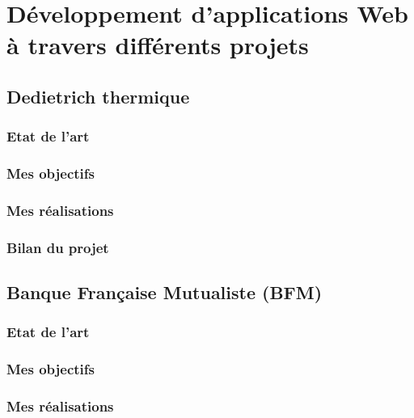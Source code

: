\documentclass[a4paper,11pt,twoside]{report}
\begin{document}
\chapter{Développement d'applications Web à travers différents projets}
  \section{Dedietrich thermique}
    \subsection*{Etat de l'art}
    \subsection*{Mes objectifs}
    \subsection*{Mes réalisations}
    \subsection*{Bilan du projet}
  \section{Banque Française Mutualiste (BFM)}
    \subsection*{Etat de l'art}
    \subsection*{Mes objectifs}
    \subsection*{Mes réalisations}
\end{document}
